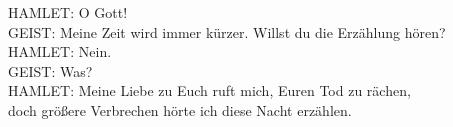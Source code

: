 \begin{playdialog}
HAMLET: O Gott!\\

GEIST: Meine Zeit wird immer kürzer. Willst du die Erzählung hören?\\

HAMLET: Nein.\\

GEIST: Was?\\

HAMLET: Meine Liebe zu Euch ruft mich, Euren Tod zu rächen,\\
doch größere Verbrechen hörte ich diese Nacht erzählen.\\

\end{playdialog}
